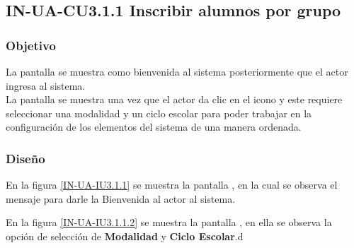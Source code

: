 \subsection{IN-UA-CU3.1.1 Inscribir alumnos por grupo}

\subsubsection{Objetivo}

	La pantalla  se muestra como bienvenida al sistema posteriormente que el actor ingresa al sistema.\\

	La pantalla   se muestra una vez que el actor da clic en el icono \IUEditar y este requiere seleccionar una modalidad y un ciclo escolar para poder trabajar en la configuración de los elementos del sistema de una manera ordenada.

\subsubsection{Diseño}

    En la figura \ref{IN-UA-IU3.1.1} se muestra la pantalla , en la cual se observa el mensaje  para darle la Bienvenida al actor al sistema.
    
    En la figura \ref{IN-UA-IU3.1.1.2} se muestra la pantalla , en ella se observa la opción de selección de \textbf{Modalidad} y \textbf{Ciclo Escolar}.d
    
   
